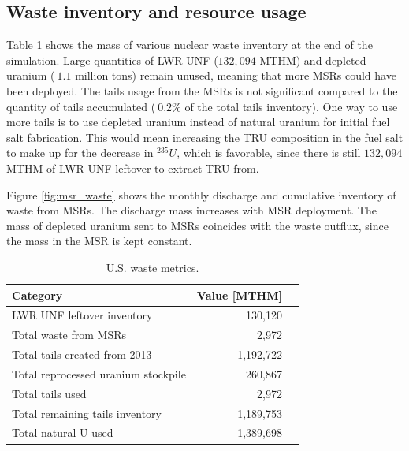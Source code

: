 \subsection{Waste inventory and resource usage}

Table \ref{tab:us_waste} shows the mass of various nuclear waste
inventory at the end of the simulation. Large quantities of \gls{LWR}
\gls{UNF} ($132,094$ MTHM) and depleted uranium ($~1.1$ million tons)
remain unused, meaning that more \glspl{MSR} could have been deployed.
The tails usage from the \glspl{MSR} is not significant compared to
the quantity of tails accumulated ($~0.2\%$ of the total tails inventory).
One way to use more tails
is to use depleted uranium instead of natural uranium for initial
fuel salt fabrication. This would mean increasing the \gls{TRU} composition
in the fuel salt to make up for the decrease in $^{235}U$, which is favorable,
since there is still $132,094$ MTHM of \gls{LWR} \gls{UNF} leftover
to extract \gls{TRU} from.

Figure \ref{fig:msr_waste} shows the monthly discharge and cumulative
inventory of waste from \glspl{MSR}. The discharge mass increases with
\gls{MSR} deployment. The mass of depleted uranium sent to \glspl{MSR} coincides
with the waste outflux, since the mass in the \gls{MSR} is kept constant.

\begin{table}[h]
	\centering
	\caption{U.S. waste metrics.}
	\begin{tabular}{lrl}
		\hline
		\textbf{Category} & \textbf{Value [MTHM]} \\
		\hline
			\gls{LWR} \gls{UNF} leftover inventory & 130,120 \\
			Total waste from \gls{MSR}s & 2,972 \\
			Total tails created from 2013 & 1,192,722 \\
			Total reprocessed uranium stockpile & 260,867 \\
			Total tails used & 2,972 \\
			Total remaining tails inventory & 1,189,753 \\
			Total natural U used & 1,389,698 \\
		\hline
	\end{tabular}
	\label{tab:us_waste}
\end{table}


